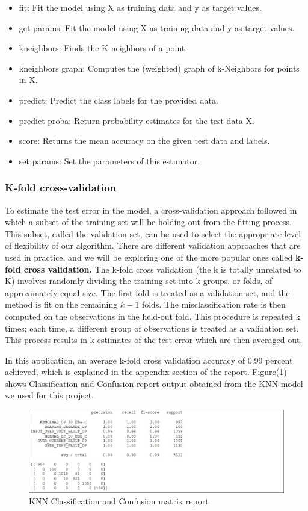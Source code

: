 \documentclass[sigconf]{acmart}
\begin{document}
\begin{itemize}
\item fit: Fit the model using X as training data and y as target values.
\item get params: Fit the model using X as training data and y as target values.
\item kneighbors: Finds the K-neighbors of a point.
\item kneighbors graph: Computes the (weighted) graph of k-Neighbors for points in X.
\item predict: Predict the class labels for the provided data.
\item predict proba: Return probability estimates for the test data X.
\item score: Returns the mean accuracy on the given test data and labels.
\item set params: Set the parameters of this estimator.
\end{itemize}

\subsubsection{K-fold cross-validation}
To estimate the test error in the model, a cross-validation approach followed in which a subset of the training set will be holding out from the fitting process. This subset, called the validation set, can be used to select the appropriate level of flexibility of our algorithm. There are different validation approaches that are used in practice, and we will be exploring one of the more popular ones called \textbf{k-fold cross validation.}
The k-fold cross validation (the k is totally unrelated to K) involves randomly dividing the training set into k groups, or folds, of approximately equal size. The first fold is treated as a validation set, and the method is fit on the remaining \(k-1\) folds. The misclassification rate is then computed on the observations in the held-out fold. This procedure is repeated k times; each time, a different group of observations is treated as a validation set. This process results in k estimates of the test error which are then averaged out. 

In this application, an average k-fold cross validation accuracy of 0.99 percent achieved, which is explained in the appendix section of the report. Figure(\ref{fig:Figure8}) shows Classification and Confusion report output obtained from the KNN model we used for this project.

\begin{figure}
\includegraphics[width=1.0\columnwidth]{images/knnclassification}
\caption{KNN Classification and Confusion matrix report} \label{fig:Figure8}
\end{figure}
\end{document}
